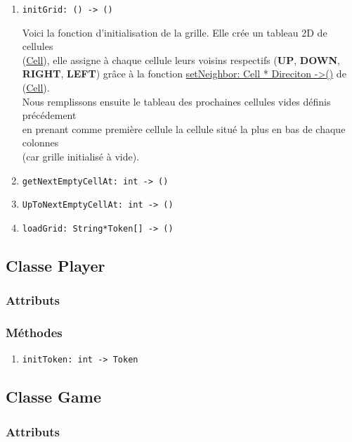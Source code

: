 \documentclass[11pt]{article}
\begin{document}
\begin{enumerate}
\item \texttt{initGrid: () -> ()}
\label{sec:org1872e4e}

Voici la fonction d'initialisation de la grille. Elle crée un tableau 2D de cellules\\
(\hyperref[orgc81d8e8]{Cell}), elle assigne à chaque cellule leurs voisins respectifs (\textbf{UP}, \textbf{DOWN},\\
\textbf{RIGHT}, \textbf{LEFT}) grâce à la fonction \hyperref[org45c9cd6]{setNeighbor: Cell * Direciton ->()} de (\hyperref[orgc81d8e8]{Cell}).\\

Nous remplissons ensuite le tableau des prochaines cellules vides définis précédement\\
en prenant comme première cellule la cellule situé la plus en bas de chaque colonnes\\
(car grille initialisé à vide).\\

\item \texttt{getNextEmptyCellAt: int -> ()}
\label{sec:orgaed8be9}
\item \texttt{UpToNextEmptyCellAt: int -> ()}
\label{sec:org7c2e71b}
\item \texttt{loadGrid: String*Token[] -> ()}
\label{sec:org734e89b}
\end{enumerate}

\subsection{Classe Player\label{org9fe4881}}
\label{sec:orgd262621}
\subsubsection{Attributs}
\label{sec:org7365c36}
\subsubsection{Méthodes}
\label{sec:orgd5c4bd7}
\begin{enumerate}
\item \texttt{initToken: int -> Token}
\label{sec:org88d0e0d}
\end{enumerate}
\subsection{Classe Game\label{org0efadc8}}
\label{sec:orge4690e1}
\subsubsection{Attributs}
\label{sec:org4a8c3b9}
\end{document}
